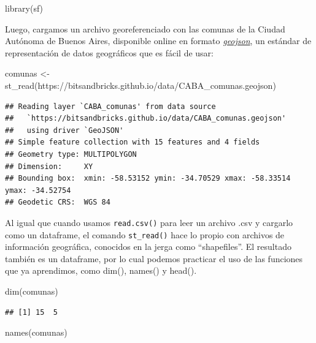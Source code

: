 \documentclass[
]{book}
\newenvironment{Shaded}{\begin{snugshade}}{\end{snugshade}}
\newcommand{\FunctionTok}[1]{\textcolor[rgb]{0.00,0.00,0.00}{#1}}
\newcommand{\NormalTok}[1]{#1}
\newcommand{\OtherTok}[1]{\textcolor[rgb]{0.56,0.35,0.01}{#1}}
\newcommand{\StringTok}[1]{\textcolor[rgb]{0.31,0.60,0.02}{#1}}
\begin{document}
\begin{Shaded}
\begin{Highlighting}[]
\FunctionTok{library}\NormalTok{(sf)}
\end{Highlighting}
\end{Shaded}

Luego, cargamos un archivo georeferenciado con las comunas de la Ciudad Autónoma de Buenos Aires, disponible online en formato \href{https://es.wikipedia.org/wiki/GeoJSON}{\emph{geojson}}, un estándar de representación de datos geográficos que es fácil de usar:

\begin{Shaded}
\begin{Highlighting}[]
\NormalTok{comunas }\OtherTok{\textless{}{-}} \FunctionTok{st\_read}\NormalTok{(}\StringTok{\textquotesingle{}https://bitsandbricks.github.io/data/CABA\_comunas.geojson\textquotesingle{}}\NormalTok{)}
\end{Highlighting}
\end{Shaded}

\begin{verbatim}
## Reading layer `CABA_comunas' from data source 
##   `https://bitsandbricks.github.io/data/CABA_comunas.geojson' 
##   using driver `GeoJSON'
## Simple feature collection with 15 features and 4 fields
## Geometry type: MULTIPOLYGON
## Dimension:     XY
## Bounding box:  xmin: -58.53152 ymin: -34.70529 xmax: -58.33514 ymax: -34.52754
## Geodetic CRS:  WGS 84
\end{verbatim}

Al igual que cuando usamos \texttt{read.csv()} para leer un archivo .csv y cargarlo como un dataframe, el comando \texttt{st\_read()} hace lo propio con archivos de información geográfica, conocidos en la jerga como ``shapefiles''. El resultado también es un dataframe, por lo cual podemos practicar el uso de las funciones que ya aprendimos, como dim(), names() y head().

\begin{Shaded}
\begin{Highlighting}[]
\FunctionTok{dim}\NormalTok{(comunas)}
\end{Highlighting}
\end{Shaded}

\begin{verbatim}
## [1] 15  5
\end{verbatim}

\begin{Shaded}
\begin{Highlighting}[]
\FunctionTok{names}\NormalTok{(comunas)}
\end{Highlighting}
\end{Shaded}
\end{document}
